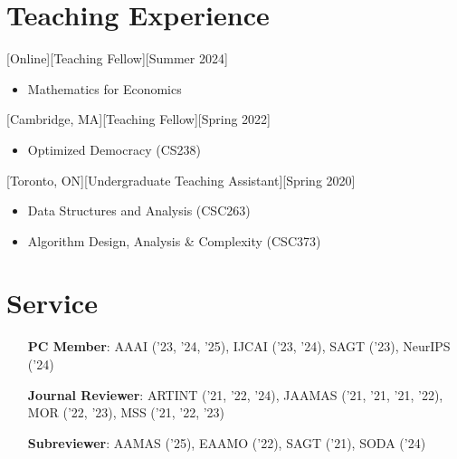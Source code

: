 \documentclass{article}
\begin{document}
    
    \section{Teaching Experience}
    [Online][Teaching Fellow][Summer 2024]
    \begin{itemize}
    	\item Mathematics for Economics
    \end{itemize}
    [Cambridge, MA][Teaching Fellow][Spring 2022]
    \begin{itemize}
        \item Optimized Democracy (CS238)
    \end{itemize}
    
    [Toronto, ON][Undergraduate Teaching Assistant][Spring 2020]
    \begin{itemize}
        \item Data Structures and Analysis (CSC263)
        \item Algorithm Design, Analysis \& Complexity (CSC373)
    \end{itemize}
    
    \section{Service}
    \begin{enumerate}[align=left]
    	\item[\textbf{PC Member}:] AAAI ('23, '24, '25), IJCAI ('23, '24), SAGT ('23), NeurIPS ('24)
    	\item[\textbf{Journal Reviewer}:] ARTINT ('21, '22, '24), JAAMAS ('21, '21, '21, '22), MOR ('22, '23), MSS ('21, '22, '23)
    	\item[\textbf{Subreviewer}:] AAMAS ('25), EAAMO ('22), SAGT ('21), SODA ('24)
    \end{enumerate}
    
\end{document}
